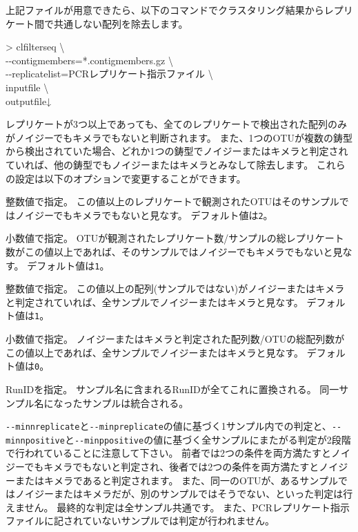 \documentclass[titlepage,10pt,a4paper,english]{jsbook}
\newenvironment{cmd}{\begin{oframed}\raggedright\ttfamily\footnotesize\setlength{\baselineskip}{1.4em}}{\end{oframed}\vspace{-1em}}
\begin{document}
上記ファイルが用意できたら、以下のコマンドでクラスタリング結果からレプリケート間で共通しない配列を除去します。
\begin{cmd}
{\textgreater} clfilterseq {\textbackslash}\\
{-}{-}contigmembers=*.contigmembers.gz {\textbackslash}\\
{-}{-}replicatelist=PCRレプリケート指示ファイル {\textbackslash}\\
inputfile {\textbackslash}\\
outputfile↓
\end{cmd}
レプリケートが3つ以上であっても、全てのレプリケートで検出された配列のみがノイジーでもキメラでもないと判断されます。
また、1つのOTUが複数の鋳型から検出されていた場合、どれか1つの鋳型でノイジーまたはキメラと判定されていれば、他の鋳型でもノイジーまたはキメラとみなして除去します。
これらの設定は以下のオプションで変更することができます。
\begin{description}\small\setlength{\baselineskip}{1.1em}
\item[\texttt{{-}{-}minnreplicate}] 整数値で指定。
この値以上のレプリケートで観測されたOTUはそのサンプルではノイジーでもキメラでもないと見なす。
デフォルト値は\texttt{2}。
\item[\texttt{{-}{-}minpreplicate}] 小数値で指定。
OTUが観測されたレプリケート数/サンプルの総レプリケート数がこの値以上であれば、そのサンプルではノイジーでもキメラでもないと見なす。
デフォルト値は\texttt{1}。
\item[\texttt{{-}{-}minnpositive}] 整数値で指定。
この値以上の配列(サンプルではない)がノイジーまたはキメラと判定されていれば、全サンプルでノイジーまたはキメラと見なす。
デフォルト値は\texttt{1}。
\item[\texttt{{-}{-}minppositive}] 小数値で指定。
ノイジーまたはキメラと判定された配列数/OTUの総配列数がこの値以上であれば、全サンプルでノイジーまたはキメラと見なす。
デフォルト値は\texttt{0}。
\item[\texttt{{-}{-}runname}] RunIDを指定。
サンプル名に含まれるRunIDが全てこれに置換される。
同一サンプル名になったサンプルは統合される。
\end{description}
\texttt{{-}{-}minnreplicate}と\texttt{{-}{-}minpreplicate}の値に基づく1サンプル内での判定と、\texttt{{-}{-}minnpositive}と\texttt{{-}{-}minppositive}の値に基づく全サンプルにまたがる判定が2段階で行われていることに注意して下さい。
前者では2つの条件を両方満たすとノイジーでもキメラでもないと判定され、後者では2つの条件を両方満たすとノイジーまたはキメラであると判定されます。
また、同一のOTUが、あるサンプルではノイジーまたはキメラだが、別のサンプルではそうでない、といった判定は行えません。
最終的な判定は全サンプル共通です。
また、PCRレプリケート指示ファイルに記されていないサンプルでは判定が行われません。
\end{document}
